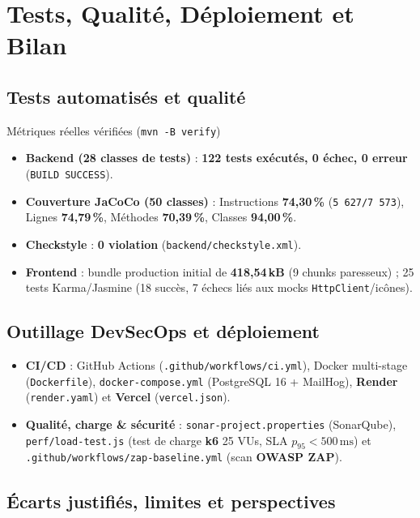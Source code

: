 \chapter{Tests, Qualité, Déploiement et Bilan}

\section{Tests automatisés et qualité}

\begin{uaszbox}{Métriques réelles vérifiées (\texttt{mvn -B verify})}
\begin{itemize}
    \item \textbf{Backend (28 classes de tests)} : \textbf{122 tests exécutés, 0 échec, 0 erreur} (\texttt{BUILD SUCCESS}).
    \item \textbf{Couverture JaCoCo (50 classes)} : Instructions \textbf{74,30\,\%} (\texttt{5\,627/7\,573}), Lignes \textbf{74,79\,\%}, Méthodes \textbf{70,39\,\%}, Classes \textbf{94,00\,\%}.
    \item \textbf{Checkstyle} : \textbf{0 violation} (\texttt{backend/checkstyle.xml}).
    \item \textbf{Frontend} : bundle production initial de \textbf{418,54\,kB} (9 chunks paresseux) ; 25 tests Karma/Jasmine (18 succès, 7 échecs liés aux mocks \texttt{HttpClient}/icônes).
\end{itemize}
\end{uaszbox}

\section{Outillage DevSecOps et déploiement}

\begin{itemize}
    \item \textbf{CI/CD} : GitHub Actions (\texttt{.github/workflows/ci.yml}), Docker multi-stage (\texttt{Dockerfile}), \texttt{docker-compose.yml} (PostgreSQL 16 + MailHog), \textbf{Render} (\texttt{render.yaml}) et \textbf{Vercel} (\texttt{vercel.json}).
    \item \textbf{Qualité, charge \& sécurité} : \texttt{sonar-project.properties} (SonarQube), \texttt{perf/load-test.js} (test de charge \textbf{k6} 25 VUs, SLA $p_{95} < 500\,\text{ms}$) et \texttt{.github/workflows/zap-baseline.yml} (scan \textbf{OWASP ZAP}).
\end{itemize}

\section{Écarts justifiés, limites et perspectives}

